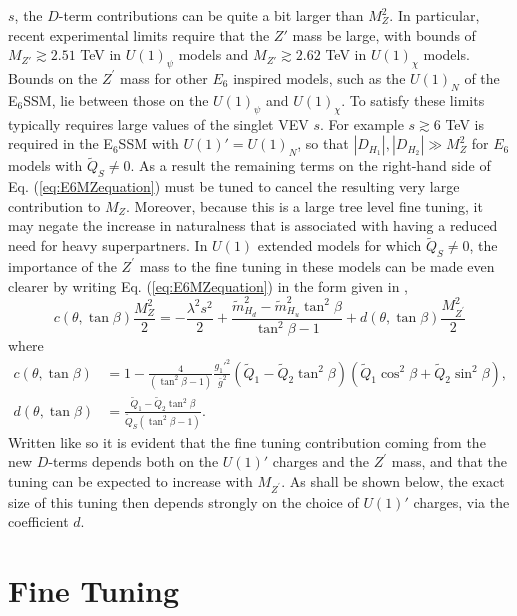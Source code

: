 \documentclass[preprint,amsmath,amssymb,aps,superscriptaddress,prd,showpacs,floatfix,nofootinbib]{revtex4-1}
\begin{document}
$s$, the $D$-term contributions can be quite a bit larger than
$M_Z^2$. In particular, recent experimental limits \cite{Aad:2014cka}
require that the $Z'$ mass be large, with bounds of $M_{Z'}\gtrsim
2.51$ TeV in $U(1)_\psi$ models and $M_{Z'}\gtrsim 2.62$ TeV in
$U(1)_\chi$ models. Bounds on the $Z^\prime$ mass for other $E_6$ inspired models, such as the $U(1)_N$ of the E$_6$SSM, lie between those on the $U(1)_\psi$ and $U(1)_\chi$. To satisfy these limits typically requires large
values of the singlet VEV $s$. For example $s\gtrsim 6$ TeV is
required in the E$_6$SSM with $U(1)'=U(1)_N$, so that
$|D_{H_1}|,|D_{H_2}|\gg M_Z^2$ for $E_6$ models with $\tilde{Q}_S\neq
0$. As a result the remaining terms on the right-hand side of
Eq. (\ref{eq:E6MZequation}) must be tuned to cancel the resulting very
large contribution to $M_Z$. Moreover, because this is a large tree
level fine tuning, it may negate the increase in naturalness that is
associated with having a reduced need for heavy superpartners. In
$U(1)$ extended models for which $\tilde{Q}_S\neq 0$, the importance
of the $Z^\prime$ mass to the fine tuning in these models can be made
even clearer by writing Eq. (\ref{eq:E6MZequation}) in the form given
in \cite{Athron:2013ipa},
\begin{equation}\label{eq:originalE6MZequation}
c(\theta,\tan\beta)\frac{M_Z^2}{2}=-\frac{\lambda^2 s^2}{2}+\frac{\tilde{m}_{H_d}^2-\tilde{m}_{H_u}^2\tan^2\beta}{\tan^2\beta-1}+d(\theta,\tan\beta)\frac{M_{Z^\prime}^2}{2}
\end{equation}
where 
\begin{align}
c(\theta,\tan\beta)&=1-\frac{4}{\left ( \tan^2\beta-1\right )}\frac{g_1'^2}{\bar{g}^2}\left ( \tilde{Q}_1-\tilde{Q}_2\tan^2\beta \right )\left ( \tilde{Q}_1\cos^2\beta+\tilde{Q}_2\sin^2\beta \right ),\label{eq:cdefn}\\
d(\theta,\tan\beta)&= \frac{\tilde{Q}_1-\tilde{Q}_2\tan^2\beta}{\tilde{Q}_S\left ( \tan^2\beta - 1\right )}.\label{eq:ddefn}
\end{align}
Written like so it is evident that the fine tuning contribution coming
from the new $D$-terms depends both on the $U(1)'$ charges and the
$Z^\prime$ mass, and that the tuning can be expected to increase with
$M_{Z^\prime}$. As shall be shown below, the exact size of this tuning
then depends strongly on the choice of $U(1)'$ charges, via the
coefficient $d$.
\section{\label{sec:tuning}Fine Tuning}
\end{document}
